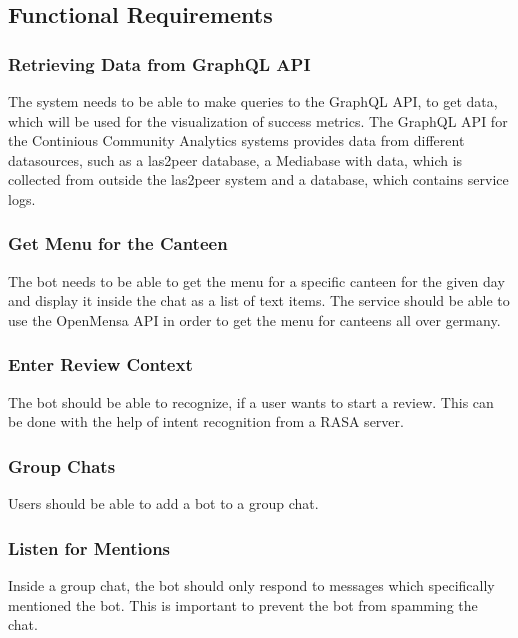 \subsection{Functional Requirements}

\subsubsection{Retrieving Data from GraphQL API}
The system needs to be able to make queries to the GraphQL API, to get data, which will be used for the visualization of success metrics. The GraphQL API  for the Continious Community Analytics systems provides data from different datasources, such as a las2peer database, a Mediabase with data, which is collected from outside the las2peer system and a database, which contains service logs.

\subsubsection{Get Menu for the Canteen} The bot needs to be able to get the menu for a specific canteen for the given day and display it inside the chat as a list of text items. The service should be able to use the OpenMensa API \footnotemark in order to get the menu for canteens all over germany.


\subsubsection{Enter Review Context} The bot should be able to recognize, if a user wants to start a review. This can be done with the help of intent recognition from a RASA server.

\subsubsection{Group Chats} Users should be able to add a bot to a group chat.

\subsubsection{Listen for Mentions} Inside a group chat, the bot should only respond to messages which specifically mentioned the bot. This is important to prevent the bot from spamming the chat.


